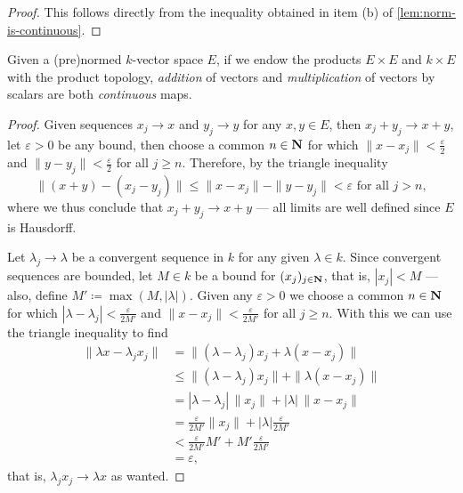 \begin{proof}
    This follows directly from the inequality obtained in item (b) of
    \cref{lem:norm-is-continuous}.
\end{proof}

\begin{proposition}
    \label{prop:continuity-sum-multiplication-scalar}
    Given a (pre)normed \(k\)-vector space \(E\), if we endow the products \(E
    \times E\) and \(k \times E\) with the product topology, \emph{addition} of
    vectors and \emph{multiplication} of vectors by scalars are both
    \emph{continuous} maps.
\end{proposition}

\begin{proof}
    Given sequences \(x_j \to x\) and \(y_j \to y\) for any \(x, y \in E\), then
    \(x_j + y_j \to x + y\), let \(\varepsilon > 0\) be any bound, then choose a
    common \(n \in \mathbf{N}\) for which \(\| x - x_j \| < \frac{\varepsilon}{2}\) and
    \(\| y - y_{j} \| < \frac{\varepsilon}{2}\) for all \(j \geq n\). Therefore, by
    the triangle inequality
    \[
        \| (x + y) - (x_j - y_j)\| \leq  \| x - x_j \| - \| y - y_j \| < \varepsilon
        \text{ for all } j > n,
    \]
    where we thus conclude that \(x_j + y_j \to x + y\) --- all limits are well
    defined since \(E\) is Hausdorff.

    Let \(\lambda_j \to \lambda\) be a convergent sequence in \(k\) for any given
    \(\lambda \in k\). Since convergent sequences are bounded, let \(M \in k\) be a
    bound for \((x_j)_{j \in \mathbf{N}}\), that is, \(|x_j| < M\) --- also,
    define \(M' \coloneq \max (M, |\lambda|)\). Given any \(\varepsilon > 0\) we
    choose a common \(n \in \mathbf{N}\) for which \(|\lambda - \lambda_j| <
    \frac{\varepsilon}{2 M'}\) and \(\| x - x_{j} \| < \frac{\varepsilon}{2 M'}\)
    for all \(j \geq n\). With this we can use the triangle inequality to find
    \begin{align*}
        \| \lambda x - \lambda_j x_j \|
         & = \| (\lambda - \lambda_j) x_j + \lambda (x - x_j)\|                        \\
         & \leq \| (\lambda - \lambda_{j}) x_j \| + \| \lambda (x - x_j) \|            \\
         & = |\lambda - \lambda_j|\, \| x_j \| + |\lambda|\, \| x - x_j \|             \\
         & = \frac{\varepsilon}{2 M'} \| x_{j} \| + |\lambda| \frac{\varepsilon}{2 M'}
        \\
         & < \frac{\varepsilon}{2 M'} M' + M' \frac{\varepsilon}{2 M'}                 \\
         & = \varepsilon,
    \end{align*}
    that is, \(\lambda_j x_j \to \lambda x\) as wanted.
\end{proof}

